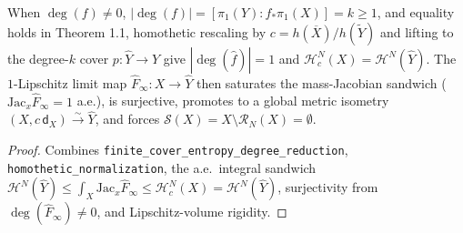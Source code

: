 \begin{theorem}
\label{thm_rcd_equality_rigidity}
\leanok
{}
When $\deg(f) \ne 0$, $|\deg(f)| = [\pi_1(Y) : f_* \pi_1(X)] = k \ge 1$, and equality holds in Theorem 1.1, homothetic rescaling by $c = h(\overline{X})/h(\widetilde{Y})$ and lifting to the degree-$k$ cover $p : \widehat{Y} \to Y$ give $|\deg(\hat{f})| = 1$ and $\mathcal{H}_c^N(X) = \mathcal{H}^N(\widehat{Y})$. The $1$-Lipschitz limit map $\hat{F}_\infty : X \to \widehat{Y}$ then saturates the mass-Jacobian sandwich ($\mathrm{Jac}_x \hat{F}_\infty = 1$ a.e.), is surjective, promotes to a global metric isometry $(X, c\,\mathsf{d}_X) \xrightarrow{\sim} \widehat{Y}$, and forces $\mathcal{S}(X) = X \setminus \mathcal{R}_N(X) = \emptyset$.
\end{theorem}
\begin{proof}\leanok Combines \texttt{finite\_cover\_entropy\_degree\_reduction}, \texttt{homothetic\_normalization}, the a.e.\ integral sandwich $\mathcal{H}^N(\widehat{Y}) \le \int_X \mathrm{Jac}_x \hat{F}_\infty \le \mathcal{H}_c^N(X) = \mathcal{H}^N(\widehat{Y})$, surjectivity from $\deg(\hat{F}_\infty) \ne 0$, and Lipschitz-volume rigidity.\end{proof}
